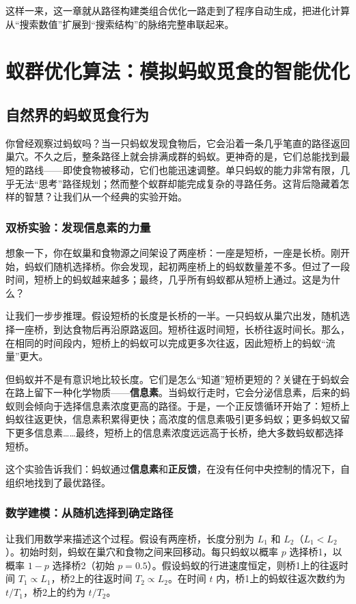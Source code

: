 \documentclass[lang=cn,zihao=-4,a4paper,fontset=windows]{beautybook}
\begin{document}
这样一来，这一章就从路径构建类组合优化一路走到了程序自动生成，把进化计算从“搜索数值”扩展到“搜索结构”的脉络完整串联起来。

\section{蚁群优化算法：模拟蚂蚁觅食的智能优化}

\subsection{自然界的蚂蚁觅食行为}

你曾经观察过蚂蚁吗？当一只蚂蚁发现食物后，它会沿着一条几乎笔直的路径返回巢穴。不久之后，整条路径上就会排满成群的蚂蚁。更神奇的是，它们总能找到最短的路线——即使食物被移动，它们也能迅速调整。单只蚂蚁的能力非常有限，几乎无法“思考”路径规划；然而整个蚁群却能完成复杂的寻路任务。这背后隐藏着怎样的智慧？让我们从一个经典的实验开始。

\subsubsection{双桥实验：发现信息素的力量}

想象一下，你在蚁巢和食物源之间架设了两座桥：一座是短桥，一座是长桥。刚开始，蚂蚁们随机选择桥。你会发现，起初两座桥上的蚂蚁数量差不多。但过了一段时间，短桥上的蚂蚁越来越多；最终，几乎所有蚂蚁都从短桥上通过。这是为什么？

让我们一步步推理。假设短桥的长度是长桥的一半。一只蚂蚁从巢穴出发，随机选择一座桥，到达食物后再沿原路返回。短桥往返时间短，长桥往返时间长。那么，在相同的时间段内，短桥上的蚂蚁可以完成更多次往返，因此短桥上的蚂蚁“流量”更大。

但蚂蚁并不是有意识地比较长度。它们是怎么“知道”短桥更短的？关键在于蚂蚁会在路上留下一种化学物质——\textbf{信息素}。当蚂蚁行走时，它会分泌信息素，后来的蚂蚁则会倾向于选择信息素浓度更高的路径。于是，一个正反馈循环开始了：短桥上蚂蚁往返更快，信息素积累得更快；高浓度的信息素吸引更多蚂蚁；更多蚂蚁又留下更多信息素……最终，短桥上的信息素浓度远远高于长桥，绝大多数蚂蚁都选择短桥。

这个实验告诉我们：蚂蚁通过\textbf{信息素}和\textbf{正反馈}，在没有任何中央控制的情况下，自组织地找到了最优路径。

\subsubsection{数学建模：从随机选择到确定路径}

让我们用数学来描述这个过程。假设有两座桥，长度分别为 $L_1$ 和 $L_2$（$L_1 < L_2$）。初始时刻，蚂蚁在巢穴和食物之间来回移动。每只蚂蚁以概率 $p$ 选择桥1，以概率 $1-p$ 选择桥2（初始 $p=0.5$）。假设蚂蚁的行进速度恒定，则桥1上的往返时间 $T_1 \propto L_1$，桥2上的往返时间 $T_2 \propto L_2$。在时间 $t$ 内，桥1上的蚂蚁往返次数约为 $t/T_1$，桥2上的约为 $t/T_2$。
\end{document}
